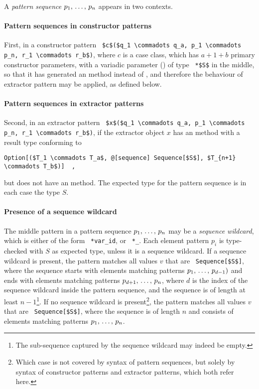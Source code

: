 A {\em pattern sequence} $p_1 ,\, \ldots ,\, p_n$ appears in two contexts. 

\paragraph{Pattern sequences in constructor patterns}
First, in a constructor pattern ~\lstinline!$c$($q_1 \commadots q_a, p_1 \commadots p_n, r_1 \commadots r_b$)!, where $c$ is a case class, which has $a+1+b$ primary constructor parameters, with a variadic parameter () of type ~\lstinline!*$S$! in the middle, so that it has generated an  method instead of , and therefore the behaviour of extractor pattern may be applied, as defined below. 

\paragraph{Pattern sequences in extractor patterns}
Second, in an extractor pattern ~\lstinline!$x$($q_1 \commadots q_a, p_1 \commadots p_n, r_1 \commadots r_b$)!, if the extractor object $x$ has an  method with a result type conforming to
\begin{lstlisting}
Option[($T_1 \commadots T_a$, @[sequence] Sequence[$S$], $T_{n+1} \commadots T_b$)]  ,
\end{lstlisting}
but does not have an  method. The expected type for the pattern sequence is in each case the type $S$. 

\paragraph{Presence of a sequence wildcard}
The middle pattern in a pattern sequence $p_1 ,\, \ldots ,\, p_n$ may be a {\em sequence wildcard}, which is either of the form ~\lstinline!*var_id!, or ~\lstinline!*_!. Each element pattern $p_i$ is type-checked with $S$ as expected type, unless it is a sequence wildcard. If a sequence wildcard is present, the pattern matches all values $v$ that are ~\lstinline!Sequence[$S$]!, where the sequence starts with elements matching patterns $p_1 ,\, \ldots ,\, p_{d-1})$ and ends with elements matching patterns $p_{d+1} ,\, \ldots ,\, p_n$, where $d$ is the index of the sequence wildcard inside the pattern sequence, and the sequence is of length at least $n-1$\footnote{The sub-sequence captured by the sequence wildcard may indeed be empty.}. If no sequence wildcard is present\footnote{Which case is not covered by syntax of pattern sequences, but solely by syntax of constructor patterns and extractor patterns, which both refer here.}, the pattern matches all values $v$ that are ~\lstinline!Sequence[$S$]!, where the sequence is of length $n$ and consists of elements matching patterns $p_1 ,\, \ldots ,\, p_n$. 


